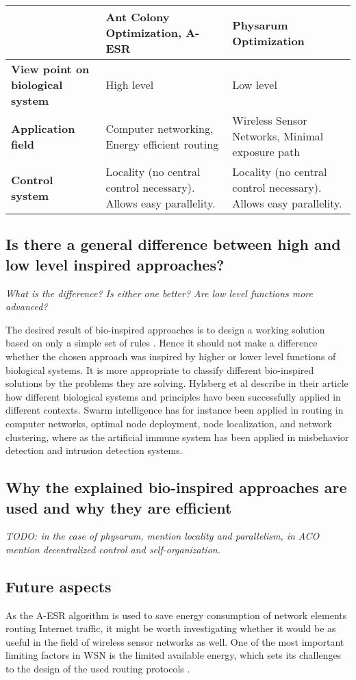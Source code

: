 \documentclass{IWORK2014}
\begin{document}
\begin{tabularx}{\textwidth}{|X|X|X|}
\hline & \textbf{Ant Colony Optimization, A-ESR} & \textbf{Physarum Optimization} \\ \hline
\textbf{View point on biological system} & High level & Low level \\ \hline
\textbf{Application field} & Computer networking, Energy efficient routing & Wireless Sensor Networks, Minimal exposure path \\ \hline
\textbf{Control system} & Locality (no central control necessary). Allows easy parallelity. & Locality (no central control necessary). Allows easy parallelity. \\ \hline
\end{tabularx}

\subsection{Is there a general difference between high and low level inspired approaches?}
\textit{What is the difference? Is either one better? Are low level functions more advanced?}

The desired result of bio-inspired approaches is to design a working solution based on only a simple set of rules \cite{dressler2010bio}. Hence it should not make a difference whether the chosen approach was inspired by higher or lower level functions of biological systems. It is more appropriate to classify different bio-inspired solutions by the problems they are solving. Hylsberg et al describe in their article \cite{hylsberg2011bioinspired} how different biological systems and principles have been successfully applied in different contexts. Swarm intelligence has for instance been applied in routing in computer networks, optimal node deployment, node localization, and network clustering, where as the artificial immune system has been applied in misbehavior detection and intrusion detection systems.

\subsection{Why the explained bio-inspired approaches are used and why they are efficient}
\textit{TODO: in the case of physarum, mention locality and parallelism, in ACO mention decentralized control and self-organization.}

\subsection{Future aspects}
As the A-ESR algorithm is used to save energy consumption of network elements routing Internet traffic, it might be worth investigating whether it would be as useful in the field of wireless sensor networks as well. One of the most important limiting factors in WSN is the limited available energy, which sets its challenges to the design of the used routing protocols \cite{hylsberg2011bioinspired}.
\end{document}

